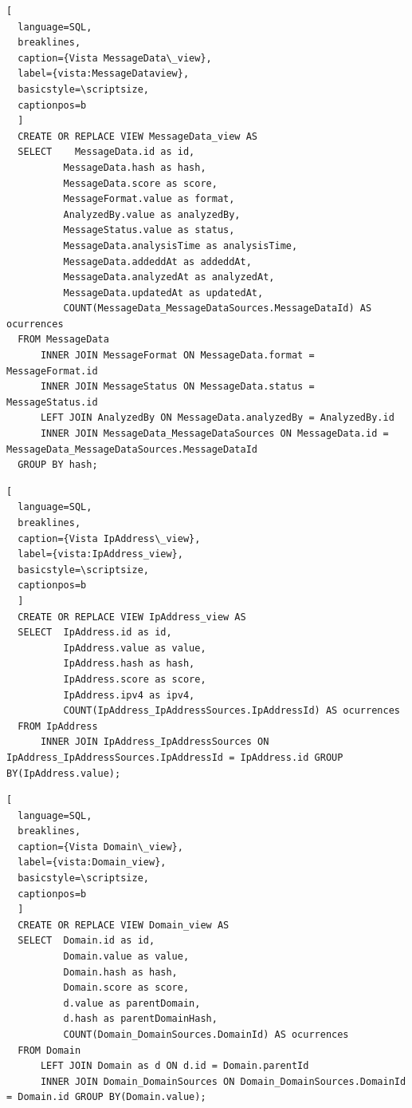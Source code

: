 \begin{lstlisting}[
  language=SQL,
  breaklines, 
  caption={Vista MessageData\_view}, 
  label={vista:MessageDataview}, 
  basicstyle=\scriptsize,
  captionpos=b
  ]
  CREATE OR REPLACE VIEW MessageData_view AS 
  SELECT	MessageData.id as id, 
          MessageData.hash as hash, 
          MessageData.score as score, 
          MessageFormat.value as format, 
          AnalyzedBy.value as analyzedBy, 
          MessageStatus.value as status, 
          MessageData.analysisTime as analysisTime, 
          MessageData.addeddAt as addeddAt, 
          MessageData.analyzedAt as analyzedAt, 
          MessageData.updatedAt as updatedAt,
          COUNT(MessageData_MessageDataSources.MessageDataId) AS ocurrences 
  FROM MessageData 
      INNER JOIN MessageFormat ON MessageData.format = MessageFormat.id
      INNER JOIN MessageStatus ON MessageData.status = MessageStatus.id
      LEFT JOIN AnalyzedBy ON MessageData.analyzedBy = AnalyzedBy.id
      INNER JOIN MessageData_MessageDataSources ON MessageData.id = MessageData_MessageDataSources.MessageDataId
  GROUP BY hash;
\end{lstlisting}

\begin{lstlisting}[
  language=SQL,
  breaklines, 
  caption={Vista IpAddress\_view}, 
  label={vista:IpAddress_view}, 
  basicstyle=\scriptsize,
  captionpos=b
  ]
  CREATE OR REPLACE VIEW IpAddress_view AS 
  SELECT  IpAddress.id as id, 
          IpAddress.value as value, 
          IpAddress.hash as hash, 
          IpAddress.score as score, 
          IpAddress.ipv4 as ipv4, 
          COUNT(IpAddress_IpAddressSources.IpAddressId) AS ocurrences  
  FROM IpAddress
      INNER JOIN IpAddress_IpAddressSources ON IpAddress_IpAddressSources.IpAddressId = IpAddress.id GROUP BY(IpAddress.value);

\end{lstlisting}

\begin{lstlisting}[
  language=SQL,
  breaklines, 
  caption={Vista Domain\_view}, 
  label={vista:Domain_view}, 
  basicstyle=\scriptsize,
  captionpos=b
  ]
  CREATE OR REPLACE VIEW Domain_view AS 
  SELECT  Domain.id as id, 
          Domain.value as value, 
          Domain.hash as hash, 
          Domain.score as score, 
          d.value as parentDomain,
          d.hash as parentDomainHash,
          COUNT(Domain_DomainSources.DomainId) AS ocurrences  
  FROM Domain
      LEFT JOIN Domain as d ON d.id = Domain.parentId
      INNER JOIN Domain_DomainSources ON Domain_DomainSources.DomainId = Domain.id GROUP BY(Domain.value);

\end{lstlisting}

